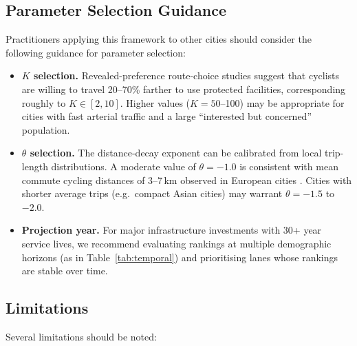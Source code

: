 \documentclass[12pt,a4paper]{article}
\begin{document}
\subsection{Parameter Selection Guidance}

Practitioners applying this framework to other cities should consider the following guidance for parameter selection:

\begin{itemize}[leftmargin=*]
    \item \textbf{$K$ selection.} Revealed-preference route-choice studies \citep{broach2012bicycle,winters2010far} suggest that cyclists are willing to travel 20--70\% farther to use protected facilities, corresponding roughly to $K \in [2, 10]$. Higher values ($K = 50$--100) may be appropriate for cities with fast arterial traffic and a large ``interested but concerned'' population.
    \item \textbf{$\theta$ selection.} The distance-decay exponent can be calibrated from local trip-length distributions. A moderate value of $\theta = -1.0$ is consistent with mean commute cycling distances of 3--7\,km observed in European cities \citep{heinen2010commuter}. Cities with shorter average trips (e.g.\ compact Asian cities) may warrant $\theta = -1.5$ to $-2.0$.
    \item \textbf{Projection year.} For major infrastructure investments with 30+ year service lives, we recommend evaluating rankings at multiple demographic horizons (as in Table~\ref{tab:temporal}) and prioritising lanes whose rankings are stable over time.
\end{itemize}

\subsection{Limitations}

Several limitations should be noted:
\end{document}

